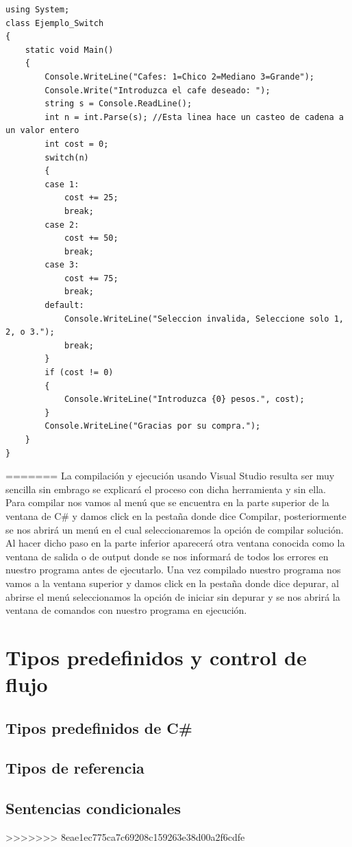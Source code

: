 \documentclass[12pt,a4paper]{report}
\begin{document}
{\begin{lstlisting}
using System;
class Ejemplo_Switch 
{
    static void Main()
    {
        Console.WriteLine("Cafes: 1=Chico 2=Mediano 3=Grande"); 
        Console.Write("Introduzca el cafe deseado: "); 
        string s = Console.ReadLine(); 
        int n = int.Parse(s); //Esta linea hace un casteo de cadena a un valor entero
        int cost = 0;
        switch(n)
        {
        case 1:
            cost += 25;
            break;
        case 2:
            cost += 50;
            break;
        case 3:
            cost += 75;
            break;
        default:
            Console.WriteLine("Seleccion invalida, Seleccione solo 1, 2, o 3.");
            break;
        }
        if (cost != 0)
        {
            Console.WriteLine("Introduzca {0} pesos.", cost);
        }
        Console.WriteLine("Gracias por su compra.");
    }
}
\end{lstlisting}
=======
La compilación y ejecución usando Visual Studio resulta ser muy sencilla sin embrago se explicará el proceso con dicha herramienta y sin ella.\\Para compilar nos vamos al menú que se encuentra en la parte superior de la ventana de C\# y damos click en la pestaña donde dice Compilar, posteriormente se nos abrirá un menú en el cual seleccionaremos la opción de compilar solución. Al hacer dicho paso en la parte inferior aparecerá otra ventana conocida como la ventana de salida o de output donde se nos informará de todos los errores en nuestro programa antes de ejecutarlo. Una vez compilado nuestro programa nos vamos a la ventana superior y damos click en la pestaña donde dice depurar, al abrirse el menú seleccionamos la opción de iniciar sin depurar y se nos abrirá la ventana de comandos con nuestro programa en ejecución.

\chapter{Tipos predefinidos y control de flujo}
\section{Tipos predefinidos de C\#}
\section{Tipos de referencia}
\section{Sentencias condicionales}
>>>>>>> 8eae1ec775ca7c69208c159263e38d00a2f6cdfe
}
\end{document}
